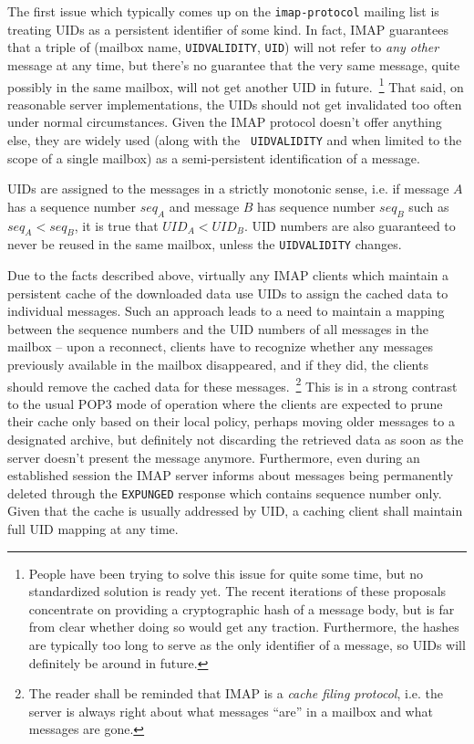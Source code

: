 \documentclass[trojita]{subfiles}
\begin{document}
The first issue which typically comes up on the {\tt imap-protocol} mailing list is treating UIDs as a persistent
identifier of some kind.  In fact, IMAP guarantees that a triple of (mailbox name, {\tt UIDVALIDITY}, {\tt UID}) will
not refer to {\em any other} message at any time, but there's no guarantee that the very same message, quite possibly in
the same mailbox, will not get another UID in future.~\footnote{People have been trying to solve this issue for quite
some time, but no standardized solution is ready yet.  The recent iterations of these proposals concentrate on providing
a cryptographic hash of a message body, but is far from clear whether doing so would get any traction.  Furthermore, the
hashes are typically too long to serve as the only identifier of a message, so UIDs will definitely be around in
future.}  That said, on reasonable server implementations, the UIDs should not get invalidated too often under normal
circumstances.  Given the IMAP protocol doesn't offer anything else, they are widely used (along with the {\tt
UIDVALIDITY} and when limited to the scope of a single mailbox) as a semi-persistent identification of a message.

UIDs are assigned to the messages in a strictly monotonic sense, i.e. if message $A$ has a sequence number $seq_A$ and
message $B$ has sequence number $seq_B$ such as $seq_A < seq_B$, it is true that $UID_A < UID_B$.  UID numbers are also
guaranteed to never be reused in the same mailbox, unless the {\tt UIDVALIDITY} changes.

Due to the facts described above, virtually any IMAP clients which maintain a persistent cache of the downloaded data
use UIDs to assign the cached data to individual messages.  Such an approach leads to a need to maintain a mapping
between the sequence numbers and the UID numbers of all messages in the mailbox -- upon a reconnect, clients have to
recognize whether any messages previously available in the mailbox disappeared, and if they did, the clients should
remove the cached data for these messages.~\footnote{The reader shall be reminded that IMAP is a {\em cache filing
protocol}, i.e. the server is always right about what messages ``are'' in a mailbox and what messages are gone.}  This
is in a strong contrast to the usual POP3 mode of operation where the clients are expected to prune their cache only
based on their local policy, perhaps moving older messages to a designated archive, but definitely not discarding the
retrieved data as soon as the server doesn't present the message anymore.  Furthermore, even during an established
session the IMAP server informs about messages being permanently deleted through the {\tt EXPUNGED} response which
contains sequence number only.  Given that the cache is usually addressed by UID, a caching client shall maintain full
UID mapping at any time.
\end{document}
